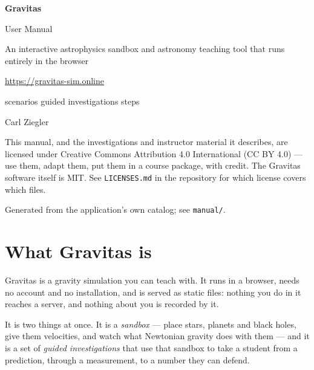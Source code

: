 \documentclass[11pt,a4paper]{article}
\begin{document}
\begin{titlepage}
\centering
\vspace*{4cm}
{\Huge\bfseries\sffamily Gravitas\par}
\vspace{0.6cm}
{\LARGE\sffamily User Manual\par}
\vspace{1.4cm}
{\large An interactive astrophysics sandbox and astronomy teaching tool
that runs entirely in the browser\par}
\vspace{2cm}
{\large\url{https://gravitas-sim.online}\par}
\vspace{0.4cm}
{\large \GravScenarios{} scenarios \quad\textbullet\quad
\GravInvestigations{} guided investigations \quad\textbullet\quad
\GravInvestigationSteps{} steps\par}
\vfill
{\large Carl Ziegler\par}
\vspace{0.3cm}
{\small This manual, and the investigations and instructor material it
describes, are licensed under Creative Commons Attribution 4.0 International
(CC BY 4.0) --- use them, adapt them, put them in a course package, with credit.
The Gravitas software itself is MIT. See \texttt{LICENSES.md} in the
repository for which license covers which files.\par}
\vspace{0.2cm}
{\small Generated from the application's own catalog; see \texttt{manual/}.\par}
\end{titlepage}

\tableofcontents
\newpage

\section{What Gravitas is}

Gravitas is a gravity simulation you can teach with. It runs in a browser, needs
no account and no installation, and is served as static files: nothing you do in
it reaches a server, and nothing about you is recorded by it.

It is two things at once. It is a \emph{sandbox} --- place stars, planets and
black holes, give them velocities, and watch what Newtonian gravity does with
them --- and it is a set of \emph{guided investigations} that use that sandbox to
take a student from a prediction, through a measurement, to a number they can
defend.
\end{document}
